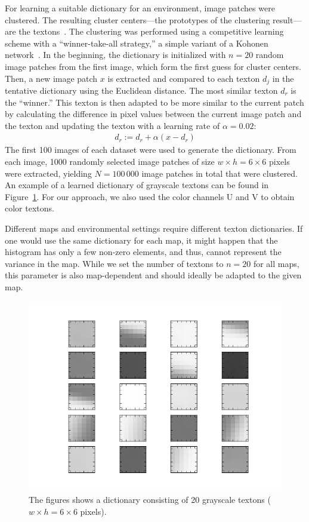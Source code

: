 \documentclass[11pt]{report}
\begin{document}
For learning a suitable dictionary for an environment, image patches
were clustered. The resulting cluster centers---the prototypes of the
clustering result---are the textons~\cite{varma2003texture}. The
clustering was performed using a competitive learning scheme with a
``winner-take-all strategy,'' a simple variant of a Kohonen
network~\cite{kohonen1990self}. In the beginning, the dictionary is
initialized with $n = 20$ random image patches from the first image,
which form the first guess for cluster centers. Then, a new image
patch $x$ is extracted and compared to each texton $d_j$ in the
tentative dictionary using the Euclidean distance. The most similar
texton $d_r$ is the ``winner.'' This texton is then adapted to be more
similar to the current patch by calculating the difference in pixel
values between the current image patch and the texton and updating the
texton with a learning rate of $\alpha = 0.02$:
\begin{align}
  d_r := d_r + \alpha (x - d_r)
\end{align}
The first 100 images of each dataset were used to generate the
dictionary. From each image, 1000 randomly selected image patches of
size $w \times h = 6 \times 6$ pixels were extracted, yielding
$N = 100\,000$ image patches in total that were clustered. An example
of a learned dictionary of grayscale textons can be found in
Figure~\ref{fig:dictionary}. For our approach, we also used the color
channels U and V to obtain color textons.

Different maps and environmental settings require different texton
dictionaries. If one would use the same dictionary for each map, it
might happen that the histogram has only a few non-zero elements, and
thus, cannot represent the variance in the map. While we set the
number of textons to $n = 20$ for all maps, this parameter is also
map-dependent and should ideally be adapted to the given map.

\begin{figure}[h!]
\begin{center}
\includegraphics[width=0.7\columnwidth]{dict}
\caption{{\label{fig:dictionary} The figures shows a dictionary
    consisting of 20 grayscale textons ($w \times h = 6 \times 6$
    pixels).}}
\end{center}
\end{figure}
\end{document}
